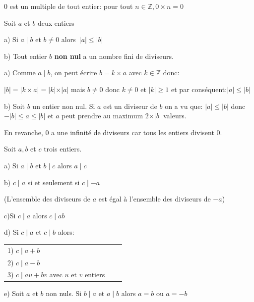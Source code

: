 \documentclass[french]{book}
\begin{document}
 \begin{rem}

$0$ est un multiple de tout entier: pour tout $n\in \mathbb{Z}, 0 \times n=0$


 \end{rem}

\begin{prop}
Soit $a$ et $b$ deux entiers

a) Si $a \mid b$ et $b \neq 0 $ alors $ \,\vert a \vert \leqslant \vert b \vert$

b) Tout entier $b$ \textbf{non nul }a un nombre fini de diviseurs.

\end{prop}

 \begin{demo}
a) Comme $a \mid b$, on peut écrire $b=k \times a$ avec $k\in \mathbb{Z}$ donc:

$\vert b \vert=\vert k \times a \vert = \vert k\vert \times \vert a\vert$
mais $b\neq 0$ donc $k \neq 0$ et $\vert k\vert \geq1$ et par conséquent:$\vert a\vert\leq\vert b\vert$

b) Soit $b$ un entier non nul. Si $a$ est un diviseur de $b$ on a vu que: $\vert a\vert\leq\vert b\vert$
donc $-\vert b \vert\leq a\leq \vert b \vert$ et $a$ peut prendre au maximum $2 \times \vert b \vert$ valeurs.

En revanche, 0 a une infinité de diviseurs car tous les entiers divisent 0.

\end{demo}


 \begin{prop} 
Soit $a, b$ et $c$ trois entiers.

a) Si $a\mid b$ et $b\mid c$ alors $a\mid c$

b) $c\mid a$ si et seulement si $c\mid -a$

{\small (L'ensemble des diviseurs de $a$ est égal à l'ensemble des diviseurs de $-a$)}



c)Si $c\mid a$ alors $c\mid ab$

d) Si $c\mid a$ et $c\mid b$ alors: \begin{tabular}[t]{lll}1) $c\mid a+b$\\2) $c\mid a-b$\\3) $c\mid au+bv$ avec $u$ et $v$ entiers
\end{tabular}

e) Soit $a$ et $b$ non nuls. Si $b\mid a$ et $a \mid b$ alors $a=b$ ou $a= -b$

\end{prop}
\end{document}
